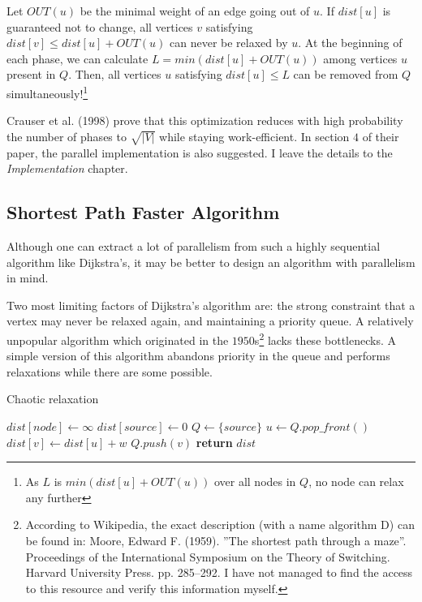 \documentclass[12pt,a4paper,twoside,openright]{report}
\begin{document}
Let $OUT(u)$ be the minimal weight of an edge going out of $u$. If $dist[u]$ is guaranteed not to change, all vertices $v$ satisfying $dist[v] \leq dist[u] + OUT(u)$ can never be relaxed by $u$. At the beginning of each phase, we can calculate $L = min(dist[u] + OUT(u))$ among vertices $u$ present in $Q$. Then, all vertices $u$ satisfying $dist[u] \leq L$ can be removed from $Q$ simultaneously!\footnote{As $L$ is $min(dist[u] + OUT(u))$ over all nodes in $Q$, no node can relax any further}

Crauser et al. (1998)\cite{dijkstra} prove that this optimization reduces with high probability the number of phases to $\sqrt{|V|}$ while staying work-efficient. In section $4$ of their paper, the parallel implementation is also suggested. I leave the details to the \textit{Implementation} chapter.

\subsection{Shortest Path Faster Algorithm}
Although one can extract a lot of parallelism from such a highly sequential algorithm like Dijkstra's, it may be better to design an algorithm with parallelism in mind. 

Two most limiting factors of Dijkstra's algorithm are: the strong constraint that a vertex may never be relaxed again, and maintaining a priority queue. A relatively unpopular algorithm which originated in the $1950$s\footnote{According to Wikipedia, the exact description (with a name algorithm D) can be found in:  Moore, Edward F. (1959).  ”The shortest path through a maze”.  Proceedings of the International Symposium on the Theory of Switching.  Harvard University Press.  pp.  285–292. I have not managed to find the access to this resource and verify this information myself.} lacks these bottlenecks. A simple version of this algorithm abandons priority in the queue and performs relaxations while there are some possible.

\begin{algorithm}
\caption{Chaotic relaxation}\label{chaotic}
\begin{algorithmic}[1]
    \State $dist[node] \gets \infty$
\EndFor
\State $dist[source] \gets 0$
\State $Q \gets \{source\}$ 
        \State $u \gets Q.pop\_front()$
            \State $dist[v] \gets dist[u] + w$
            \State $Q.push(v)$
        \EndIf
      \EndFor
    \EndWhile
\State \textbf{return} $dist$
\EndProcedure
\end{algorithmic}
\end{algorithm}
\end{document}
